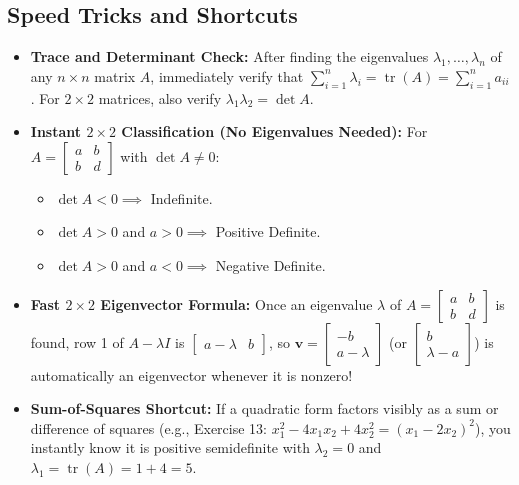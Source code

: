 \documentclass[11pt, letterpaper]{article}
\theoremstyle{definition}
\theoremstyle{remark}
\begin{document}
\subsection{Speed Tricks and Shortcuts}
\begin{itemize}
    \item \textbf{Trace and Determinant Check:} After finding the eigenvalues $\lambda_1, \dots, \lambda_n$ of any $n \times n$ matrix $A$, immediately verify that $\sum_{i=1}^n \lambda_i = \operatorname{tr}(A) = \sum_{i=1}^n a_{ii}$. For $2 \times 2$ matrices, also verify $\lambda_1 \lambda_2 = \det A$.
    \item \textbf{Instant $2 \times 2$ Classification (No Eigenvalues Needed):} For $A = \begin{bmatrix} a & b \\ b & d \end{bmatrix}$ with $\det A \ne 0$:
    \begin{itemize}
        \item $\det A < 0 \implies$ Indefinite.
        \item $\det A > 0$ and $a > 0 \implies$ Positive Definite.
        \item $\det A > 0$ and $a < 0 \implies$ Negative Definite.
    \end{itemize}
    \item \textbf{Fast $2 \times 2$ Eigenvector Formula:} Once an eigenvalue $\lambda$ of $A = \begin{bmatrix} a & b \\ b & d \end{bmatrix}$ is found, row 1 of $A - \lambda I$ is $\begin{bmatrix} a - \lambda & b \end{bmatrix}$, so $\mathbf{v} = \begin{bmatrix} -b \\ a - \lambda \end{bmatrix}$ (or $\begin{bmatrix} b \\ \lambda - a \end{bmatrix}$) is automatically an eigenvector whenever it is nonzero!
    \item \textbf{Sum-of-Squares Shortcut:} If a quadratic form factors visibly as a sum or difference of squares (e.g., Exercise 13: $x_1^2 - 4x_1x_2 + 4x_2^2 = (x_1 - 2x_2)^2$), you instantly know it is positive semidefinite with $\lambda_2 = 0$ and $\lambda_1 = \operatorname{tr}(A) = 1 + 4 = 5$.
\end{itemize}
\end{document}
